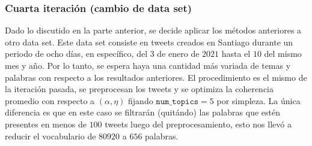 \documentclass{article}
\begin{document}
	
	\subsubsection{Cuarta iteración (cambio de data set)}
	Dado lo discutido en la parte anterior, se decide aplicar los métodos anteriores a otro data set. Este data set consiste en tweets creados en Santiago durante un periodo de ocho días, en específico, del $3$ de enero de $2021$ hasta el $10$ del mismo mes y año. Por lo tanto, se espera haya una cantidad más variada de temas y palabras con respecto a los resultados anteriores. El procedimiento es el mismo de la iteración pasada, se preprocesan los tweets y se optimiza la coherencia promedio con respecto a $(\alpha, \eta)$ fijando $\texttt{num\_topics}=5$ por simpleza. La única diferencia es que en este caso se filtrarán (quitándo) las palabras que estén presentes en menos de $100$ tweets luego del preprocesamiento, esto nos llevó a reducir el vocabulario de $80920$ a $656$ palabras.  
	
\end{document}
